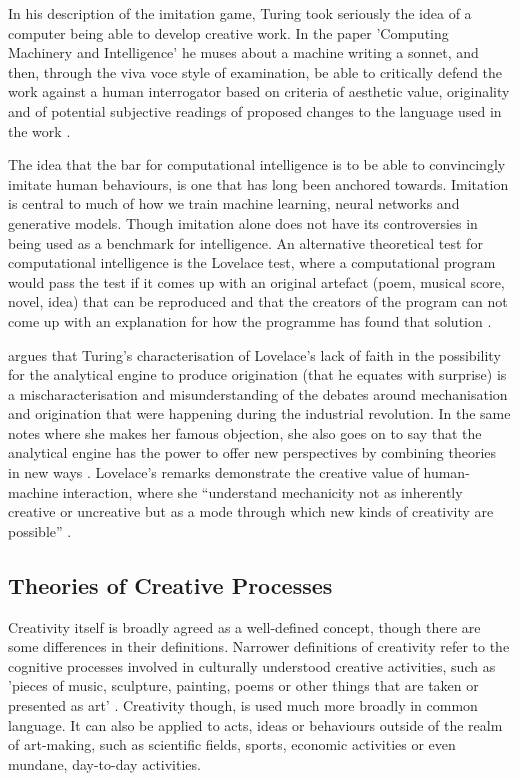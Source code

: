 In his description of the imitation game, Turing took seriously the idea of a computer being able to develop creative work. 
In the paper 'Computing Machinery and Intelligence' he muses about a machine writing a sonnet, and then, through the viva voce style of examination, be able to critically defend the work against a human interrogator based on criteria of aesthetic value, originality and of potential subjective readings of proposed changes to the language used in the work \citep{machinery1950computing}.

The idea that the bar for computational intelligence is to be able to convincingly imitate human behaviours, is one that has long been anchored towards. 
Imitation is central to much of how we train machine learning, neural networks and generative models. 
Though imitation alone does not have its controversies in being used as a benchmark for intelligence. 
An alternative theoretical test for computational intelligence is the Lovelace test, where a computational program would pass the test if it comes up with an original artefact (poem, musical score, novel, idea) that can be reproduced and that the creators of the program can not come up with an explanation for how the programme has found that solution \citep{bringsjord2003creativity}. 

\cite{ward2020computational} argues that Turing's characterisation of Lovelace's lack of faith in the possibility for the analytical engine to produce origination (that he equates with surprise) is a mischaracterisation and misunderstanding of the debates around mechanisation and origination that were happening during the industrial revolution. 
In the same notes where she makes her famous objection, she also goes on to say that the analytical engine has the power to offer new perspectives by combining theories in new ways \citep{lovelace1843notes}.
 Lovelace's remarks demonstrate the creative value of human-machine interaction, where she ``understand mechanicity not as inherently creative or uncreative but as a mode through which new kinds of creativity are possible'' \citep{ward2020computational}.

\subsection{Theories of Creative Processes}

Creativity itself is broadly agreed as a well-defined concept, though there are some differences in their definitions. 
Narrower definitions of creativity refer to the cognitive processes involved in culturally understood creative activities, such as 'pieces of music, sculpture, painting, poems or other things that are taken or presented as art' \citep{wiggins2015evolutionary}.
Creativity though, is used much more broadly in common language. 
It can also be applied to acts, ideas or behaviours outside of the realm of art-making, such as scientific fields, sports, economic activities or even mundane, day-to-day activities.


